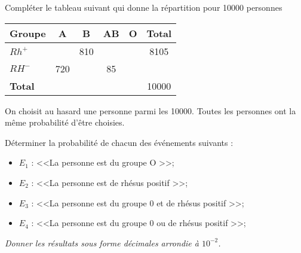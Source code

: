 \begin{questions}
	
\question[5] Compléter le tableau suivant qui donne la répartition pour \num{10000} personnes

\begin{center}
	\begin{tabular}{|@{\ }l@{\ }|c|c|c|c|@{\ }@{\ }c@{\ }@{\ }|}
	\hline
	\textbf{Groupe} & \textbf{A}   & \textbf{B}   & \textbf{AB} & \textbf{O}        & \textbf{Total}       \\ \hline
	\textbf{$Rh^+$} &     & 810 &    &  & \num{8105}  \\ \hline
	\textbf{$RH^-$} & 720 &     & 85 &          &             \\ \hline
	\textbf{Total}  &     &     &    &          & \num{10000} \\ \hline
\end{tabular}

\end{center}


\question[5]

On choisit au hasard une personne parmi les \num{10000}. Toutes les personnes ont la même probabilité d'être choisies.

Déterminer la probabilité de chacun des événements suivants :

\begin{itemize}
	\item $E_1$ : <<La personne est du groupe O >>;
	\item $E_2$ : <<La personne est de rhésus positif >>;
	\item $E_3$ : <<La personne est du groupe 0 et de rhésus positif >>;
	\item $E_4$ : <<La personne est du groupe 0 ou de rhésus positif >>;
\end{itemize}
\textit{Donner les résultats sous forme décimales arrondie à $10^{-2}$. }


\fillwithdottedlines{9cm}
\end{questions}
